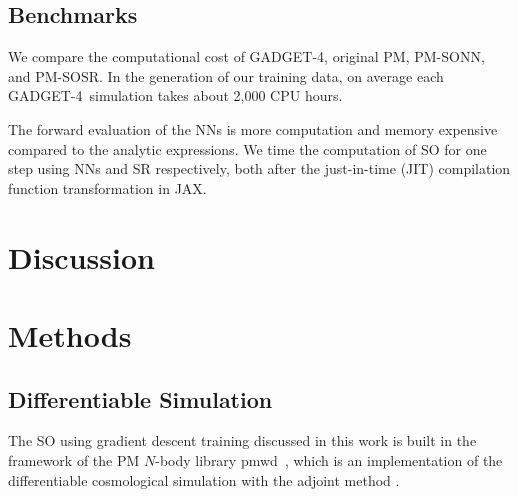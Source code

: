 \documentclass[modern, trackchanges, dvipsnames]{aastex631}
\newcommand{\pmwd}{{\usefont{T1}{nova}{m}{sl}pmwd}}
\newcommand{\GADGET}{{{\fontsize{10pt}{12pt}\selectfont GADGET}-4}}
\begin{document}
\subsection{Benchmarks}
We compare the computational cost of \GADGET, original PM, PM-SONN, and
PM-SOSR.
In the generation of our training data, on average each \GADGET\
simulation takes about 2,000 CPU hours.


The forward evaluation of the NNs is more computation and memory
expensive compared to the analytic expressions.
We time the computation of SO for one step using NNs and SR
respectively, both after the just-in-time (JIT) compilation function
transformation in JAX.


\vspace{1em}
\section{Discussion}


\vspace{1em}
\section{Methods}


\vspace{1em}
\subsection{Differentiable Simulation}
\label{sec:pmwd}

The SO using gradient descent training discussed in this work is built
in the framework of the PM $N$-body library \pmwd\ \citep{Li2022b},
which is an implementation of the differentiable cosmological simulation
with the adjoint method \citep{Li2022a}.
\end{document}
